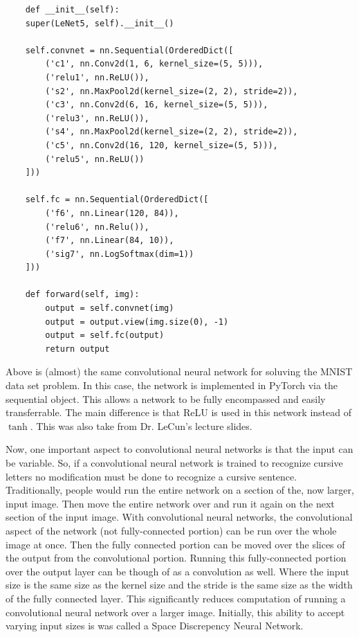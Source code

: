 \begin{verbatim}
    def __init__(self):
    super(LeNet5, self).__init__()
    
    self.convnet = nn.Sequential(OrderedDict([
        ('c1', nn.Conv2d(1, 6, kernel_size=(5, 5))), 
        ('relu1', nn.ReLU()), 
        ('s2', nn.MaxPool2d(kernel_size=(2, 2), stride=2)),
        ('c3', nn.Conv2d(6, 16, kernel_size=(5, 5))),
        ('relu3', nn.ReLU()),
        ('s4', nn.MaxPool2d(kernel_size=(2, 2), stride=2)),
        ('c5', nn.Conv2d(16, 120, kernel_size=(5, 5))),
        ('relu5', nn.ReLU())
    ]))
    
    self.fc = nn.Sequential(OrderedDict([
        ('f6', nn.Linear(120, 84)), 
        ('relu6', nn.Relu()),
        ('f7', nn.Linear(84, 10)),
        ('sig7', nn.LogSoftmax(dim=1))
    ]))
    
    def forward(self, img):
        output = self.convnet(img)
        output = output.view(img.size(0), -1)
        output = self.fc(output)
        return output
\end{verbatim}

Above is (almost) the same convolutional neural network for soluving the MNIST 
data set problem. In this case, the network is implemented in PyTorch via the 
sequential object. This allows a network to be fully encompassed and easily
transferrable. The main difference is that ReLU is used in this network instead
of $\tanh$. This was also take from Dr. LeCun's lecture slides. 

Now, one important aspect to convolutional neural networks is that the input can be variable. 
So, if a convolutional neural network is trained to recognize cursive letters no modification must be done to recognize a cursive sentence.
Traditionally, people would run the entire network on a section of the, now larger, input image.
Then move the entire network over and run it again on the next section of the input image.
With convolutional neural networks, the convolutional aspect of the network (not fully-connected portion) can be run over the whole image at once.
Then the fully connected portion can be moved over the slices of the output from the convolutional portion.
Running this fully-connected portion over the output layer can be though of as a convolution as well.
Where the input size is the same size as the kernel size and the stride is the same size as the width of the fully connected layer.
This significantly reduces computation of running a convolutional neural network over a larger image.
Initially, this ability to accept varying input sizes is was called a Space Discrepency Neural Network.

